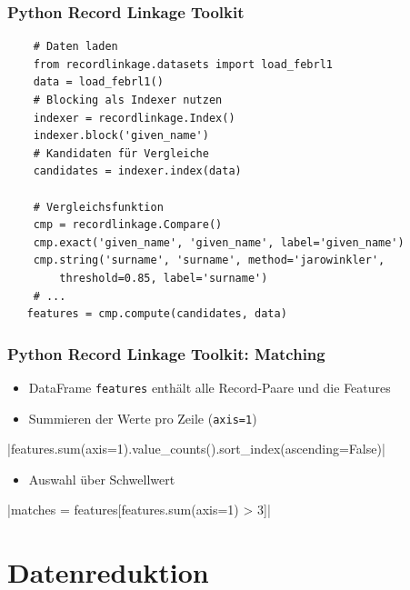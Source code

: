     
\begin{frame}
\frametitle{Python Record Linkage Toolkit}
    
    \begin{verbatim}
    # Daten laden
    from recordlinkage.datasets import load_febrl1
    data = load_febrl1()
    # Blocking als Indexer nutzen
    indexer = recordlinkage.Index()
    indexer.block('given_name')
    # Kandidaten für Vergleiche
    candidates = indexer.index(data) 

    # Vergleichsfunktion
    cmp = recordlinkage.Compare()
    cmp.exact('given_name', 'given_name', label='given_name')
    cmp.string('surname', 'surname', method='jarowinkler',
        threshold=0.85, label='surname')
    # ...
   features = cmp.compute(candidates, data) 
\end{verbatim}
    
\end{frame}
    
    \begin{frame}
    \frametitle{Python Record Linkage Toolkit: Matching}
    
    \begin{itemize}
    \item DataFrame \texttt{features} enthält alle Record-Paare und die Features
    \item Summieren der Werte pro Zeile (\texttt{axis=1})
    \end{itemize}
 
    |features.sum(axis=1).value_counts().sort_index(ascending=False)|
    
    \begin{itemize}
    \item Auswahl über Schwellwert
    \end{itemize}
    
    |matches = features[features.sum(axis=1) > 3]|

    
    \end{frame}
    
    \section{Datenreduktion}
    
